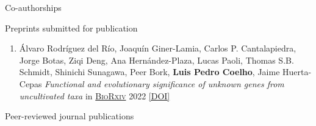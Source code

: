 \documentclass{article}
\renewcommand\section[1]{%
    \par\vspace{1.4em}\penalty-100%
    {\subhead #1}%
    \par\penalty100\vspace{0.1em}\penalty100%
}
\renewcommand\subsubsection[1]{%
    \par\vspace{.1em}%
    {\hspace{1em}\subsubsubhead #1}%
    \par\vspace{.2em}%
}
\newcommand\showdoi[1]{%
    \href{http://dx.doi.org/#1}{[DOI]}%
}
\newcommand\pubname[1]{\textsc{\uline{#1}}}
\begin{document}
\break
\section{Co-authorships}

\subsubsection{Preprints submitted for publication}

\begin{enumerate}[resume]

\item Álvaro Rodríguez del Río, Joaquín Giner-Lamia, Carlos P. Cantalapiedra, Jorge Botas, Ziqi Deng, Ana Hernández-Plaza, Lucas Paoli, Thomas S.B. Schmidt, Shinichi Sunagawa, Peer Bork,  \textbf{Luis Pedro Coelho}, Jaime Huerta-Cepas \emph{Functional and evolutionary significance of unknown genes from uncultivated taxa} in \pubname{BioRxiv} 2022 \showdoi{10.1101/2022.01.26.477801}

\end{enumerate}

\subsubsection{Peer-reviewed journal publications}
\end{document}
